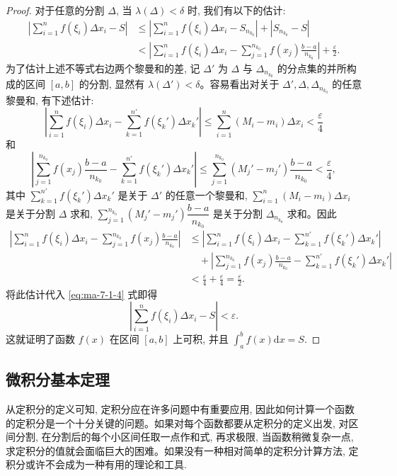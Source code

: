 \begin{proof}
对于任意的分割 $\Delta$, 当 $\lambda(\Delta)<\delta$ 时, 我们有以下的估计:
\begin{equation}
\begin{aligned}
  \left|\sum_{i=1}^n f(\xi_i)\Delta x_i-S\right|
  &\leq \left|\sum_{i=1}^n f(\xi_i)\Delta x_i-S_{n_{k_0}}\right|+|S_{n_{k_0}}-S|\\
  &< \left|\sum_{i=1}^n f(\xi_i)\Delta x_i-\sum_{j=1}^{n_{k_0}} f(x_j)\frac{b-a}{n_{k_0}}\right|+\frac{\varepsilon}{2}.
\end{aligned}
\label{eq:ma-7-1-4}
\end{equation}
为了估计上述不等式右边两个黎曼和的差, 记 $\Delta'$ 为 $\Delta$ 与 $\Delta_{n_{k_0}}$ 的分点集的并所构成的区间 $[a,b]$ 的分割, 显然有 $\lambda(\Delta')<\delta$。容易看出对关于 $\Delta',\Delta,\Delta_{n_{k_0}}$ 的任意黎曼和, 有下述估计:
\[
  \left|\sum_{i=1}^n f(\xi_i)\Delta x_i-\sum_{k=1}^{n'}f(\xi_k')\Delta x_k'\right|
  \leq \sum_{i=1}^n(M_i-m_i)\Delta x_i<\frac{\varepsilon}{4}
\]
和
\[
  \left|\sum_{j=1}^{n_{k_0}}f(x_j)\frac{b-a}{n_{k_0}}-\sum_{k=1}^{n'}f(\xi_k')\Delta x_k'\right|
  \leq \sum_{j=1}^{n_{k_0}}(M_j'-m_j')\frac{b-a}{n_{k_0}}<\frac{\varepsilon}{4},
\]
其中 $\sum\limits_{k=1}^{n'}f(\xi_k')\Delta x_k'$ 是关于 $\Delta'$ 的任意一个黎曼和, $\sum\limits_{i=1}^n(M_i-m_i)\Delta x_i$ 是关于分割 $\Delta$ 求和, $\sum\limits_{j=1}^{n_{k_0}}(M_j'-m_j')\dfrac{b-a}{n_{k_0}}$ 是关于分割 $\Delta_{n_{k_0}}$ 求和。因此
\[
\begin{aligned}
  \left|\sum_{i=1}^n f(\xi_i)\Delta x_i-\sum_{j=1}^{n_{k_0}}f(x_j)\frac{b-a}{n_{k_0}}\right|
  &\leq \left|\sum_{i=1}^n f(\xi_i)\Delta x_i-\sum_{k=1}^{n'}f(\xi_k')\Delta x_k'\right|\\
  &\quad+\left|\sum_{j=1}^{n_{k_0}}f(x_j)\frac{b-a}{n_{k_0}}-\sum_{k=1}^{n'}f(\xi_k')\Delta x_k'\right|\\
  &<\frac{\varepsilon}{4}+\frac{\varepsilon}{4}=\frac{\varepsilon}{2}.
\end{aligned}
\]
将此估计代入 \eqref{eq:ma-7-1-4} 式即得
\[
  \left|\sum_{i=1}^n f(\xi_i)\Delta x_i-S\right|<\varepsilon.
\]
这就证明了函数 $f(x)$ 在区间 $[a,b]$ 上可积, 并且 $\int_a^b f(x)\mathrm dx=S$.
\end{proof}


\subsection{微积分基本定理}
\label{subsec:ma-7-1-5}

从定积分的定义可知, 定积分应在许多问题中有重要应用, 因此如何计算一个函数的定积分是一个十分关键的问题。如果对每个函数都要从定积分的定义出发, 对区间分割, 在分割后的每个小区间任取一点作和式, 再求极限, 当函数稍微复杂一点, 求定积分的值就会面临巨大的困难。如果没有一种相对简单的定积分计算方法, 定积分或许不会成为一种有用的理论和工具.


